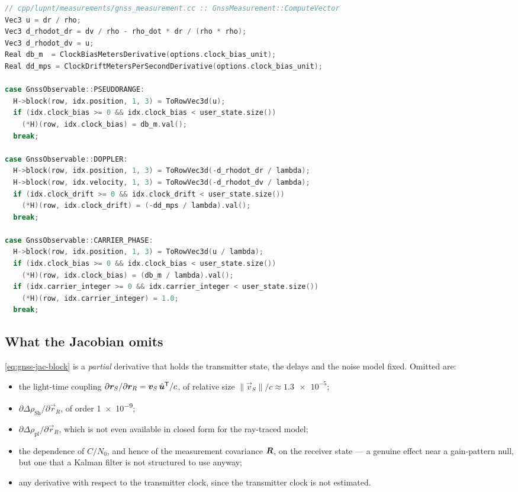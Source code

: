 \begin{lstlisting}[language=cpp, caption={Analytic Jacobian rows.},
label={lst:gnss-jacobian}]
// cpp/lupnt/measurements/gnss_measurement.cc :: GnssMeasurement::ComputeVector
Vec3 u = dr / rho;
Vec3 d_rhodot_dr = dv / rho - rho_dot * dr / (rho * rho);
Vec3 d_rhodot_dv = u;
Real db_m  = ClockBiasMetersDerivative(options.clock_bias_unit);
Real dd_mps = ClockDriftMetersPerSecondDerivative(options.clock_bias_unit);

case GnssObservable::PSEUDORANGE:
  H->block(row, idx.position, 1, 3) = ToRowVec3d(u);
  if (idx.clock_bias >= 0 && idx.clock_bias < user_state.size())
    (*H)(row, idx.clock_bias) = db_m.val();
  break;

case GnssObservable::DOPPLER:
  H->block(row, idx.position, 1, 3) = ToRowVec3d(-d_rhodot_dr / lambda);
  H->block(row, idx.velocity, 1, 3) = ToRowVec3d(-d_rhodot_dv / lambda);
  if (idx.clock_drift >= 0 && idx.clock_drift < user_state.size())
    (*H)(row, idx.clock_drift) = (-dd_mps / lambda).val();
  break;

case GnssObservable::CARRIER_PHASE:
  H->block(row, idx.position, 1, 3) = ToRowVec3d(u / lambda);
  if (idx.clock_bias >= 0 && idx.clock_bias < user_state.size())
    (*H)(row, idx.clock_bias) = (db_m / lambda).val();
  if (idx.carrier_integer >= 0 && idx.carrier_integer < user_state.size())
    (*H)(row, idx.carrier_integer) = 1.0;
  break;
\end{lstlisting}

\subsection{What the Jacobian omits}

\cref{eq:gnss-jac-block} is a \emph{partial} derivative that holds the
transmitter state, the delays and the noise model fixed. Omitted are:

\begin{itemize}[leftmargin=1.4em,itemsep=1pt]
  \item the light-time coupling
    $\partial \bm{r}_S / \partial \bm{r}_R
     = \bm{v}_S\,\hat{\bm{u}}^{\mathsf{T}} / c$, of relative size
    $\lVert\vec{v}_S\rVert/c \approx \num{1.3e-5}$;
  \item $\partial \Delta\rho_{\mathrm{Sh}} / \partial \vec{r}_R$, of order
    \num{1e-9};
  \item $\partial \Delta\rho_{\mathrm{pl}} / \partial \vec{r}_R$, which is not
    even available in closed form for the ray-traced model;
  \item the dependence of $C/N_0$, and hence of the measurement covariance
    $\bm{R}$, on the receiver state --- a genuine effect near a gain-pattern
    null, but one that a Kalman filter is not structured to use anyway;
  \item any derivative with respect to the transmitter clock, since the
    transmitter clock is not estimated.
\end{itemize}

